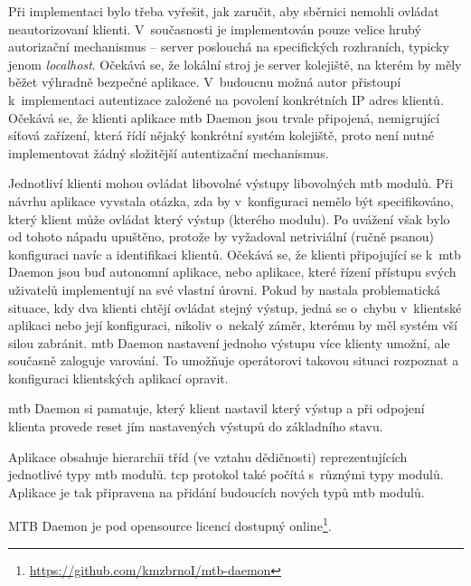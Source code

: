 Při implementaci bylo třeba vyřešit, jak zaručit, aby sběrnici nemohli ovládat
neautorizovaní klienti. V~současnosti je implementován pouze velice hrubý
autorizační mechanismus – server poslouchá na specifických rozhraních,
typicky jenom \textit{localhost}. Očekává se, že lokální stroj je server
kolejiště, na kterém by měly běžet výhradně bezpečné aplikace. V~budoucnu možná
autor přistoupí k~implementaci autentizace založené na povolení konkrétních
IP adres klientů. Očekává se, že klienti aplikace \gls{mtb} Daemon jsou trvale
připojená, nemigrující síťová zařízení, která řídí nějaký konkrétní systém
kolejiště, proto není nutné implementovat žádný složitější autentizační
mechanismus.

Jednotliví klienti mohou ovládat libovolné výstupy libovolných \gls{mtb}
modulů.  Při návrhu aplikace vyvstala otázka, zda by v~konfiguraci nemělo být
specifikováno, který klient může ovládat který výstup (kterého modulu). Po
uvážení však bylo od tohoto nápadu upuštěno, protože by vyžadoval netriviální
(ručně psanou) konfiguraci navíc a identifikaci klientů. Očekává se, že klienti
připojující se k~\gls{mtb} Daemon jsou buď autonomní aplikace, nebo
aplikace, které řízení přístupu svých uživatelů implementují na své vlastní
úrovni. Pokud by nastala problematická situace, kdy dva klienti chtějí ovládat
stejný výstup, jedná se o~chybu v~klientské aplikaci nebo její konfiguraci,
nikoliv o~nekalý záměr, kterému by měl systém vší silou zabránit. \gls{mtb}
Daemon nastavení jednoho výstupu více klienty umožní, ale současně zaloguje
varování. To umožňuje operátorovi takovou situaci rozpoznat a konfiguraci
klientských aplikací opravit.

\gls{mtb} Daemon si pamatuje, který klient nastavil který výstup a při
odpojení klienta provede reset jím nastavených výstupů do základního stavu.

Aplikace obsahuje hierarchii tříd (ve vztahu dědičnosti) reprezentujících
jednotlivé typy \gls{mtb} modulů. \gls{tcp} protokol také počítá s~různými typy
modulů. Aplikace je tak připravena na přidání budoucích nových typů \gls{mtb}
modulů.

MTB Daemon je pod opensource licencí dostupný
online\footnote{\url{https://github.com/kmzbrnoI/mtb-daemon}}.
